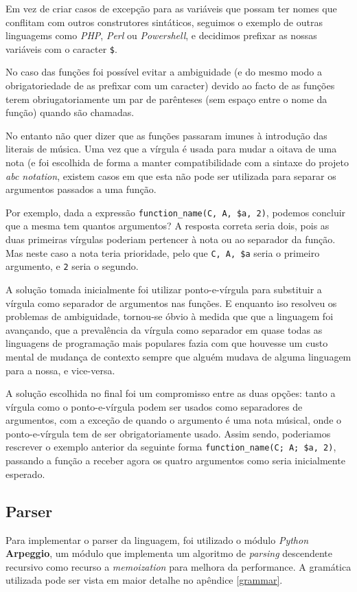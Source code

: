 Em vez de criar casos de excepção para as variáveis que possam ter nomes que conflitam com outros construtores sintáticos, seguimos o exemplo de outras linguagems como \textit{PHP}, \textit{Perl} ou \textit{Powershell}, e decidimos prefixar as nossas variáveis com o caracter \texttt{\$}.

No caso das funções foi possível evitar a ambiguidade (e do mesmo modo a obrigatoriedade de as prefixar com um caracter) devido ao facto de as funções terem obriugatoriamente um par de parênteses (sem espaço entre o nome da função) quando são chamadas.

No entanto não quer dizer que as funções passaram imunes à introdução das literais de música. Uma vez que a vírgula é usada para mudar a oitava de uma nota (e foi escolhida de forma a manter compatibilidade com a sintaxe do projeto \textit{abc notation}, existem casos em que esta não pode ser utilizada para separar os argumentos passados a uma função.

Por exemplo, dada a expressão \texttt{function\_name(C, A, \$a, 2)}, podemos concluir que a mesma tem quantos argumentos? A resposta correta seria dois, pois as duas primeiras vírgulas poderiam pertencer à nota ou ao separador da função. Mas neste caso a nota teria prioridade, pelo que \texttt{C, A, \$a} seria o primeiro argumento, e \texttt{2} seria o segundo.

A solução tomada inicialmente foi utilizar ponto-e-vírgula para substituir a vírgula como separador de argumentos  nas funções. E enquanto iso resolveu os problemas de ambiguidade, tornou-se óbvio à medida que que a linguagem foi avançando, que a prevalência da vírgula como separador em quase todas as linguagens de programação mais populares fazia com que houvesse um custo mental de mudança de contexto sempre que alguém mudava de alguma linguagem para a nossa, e vice-versa.

A solução escolhida no final foi um compromisso entre as duas opções: tanto a vírgula como o ponto-e-vírgula podem ser usados como separadores de argumentos, com a exceção de quando o argumento é uma nota músical, onde o ponto-e-vírgula tem de ser obrigatoriamente usado. Assim sendo, poderiamos rescrever o exemplo anterior da seguinte forma \texttt{function\_name(C; A; \$a, 2)}, passando a função a receber agora os quatro argumentos como seria inicialmente esperado.

\subsection{Parser}
Para implementar o parser da linguagem, foi utilizado o módulo \textit{Python} \textbf{Arpeggio}, um módulo que implementa um algoritmo de \textit{parsing} descendente recursivo como recurso a \textit{memoization} para melhora da performance. A gramática utilizada pode ser vista em maior detalhe no apêndice \ref{grammar}.


